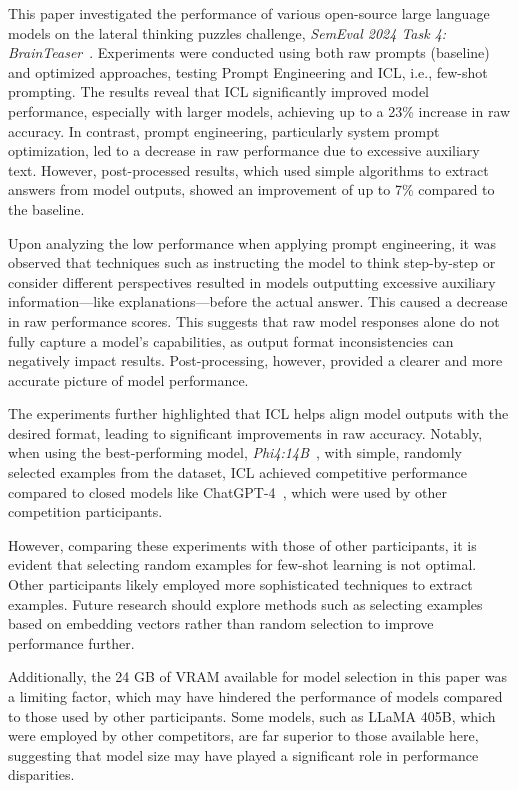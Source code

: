 This paper investigated the performance of various open-source large language models on the lateral thinking puzzles challenge, \textit{SemEval 2024 Task 4: BrainTeaser}~\cite{jiangBRAINTEASERLateralThinking2023}. Experiments were conducted using both raw prompts (baseline) and optimized approaches, testing Prompt Engineering and \acf{ICL}, i.e., few-shot prompting. The results reveal that \ac{ICL} significantly improved model performance, especially with larger models, achieving up to a 23\% increase in raw accuracy. In contrast, prompt engineering, particularly system prompt optimization, led to a decrease in raw performance due to excessive auxiliary text. However, post-processed results, which used simple algorithms to extract answers from model outputs, showed an improvement of up to 7\% compared to the baseline.

Upon analyzing the low performance when applying prompt engineering, it was observed that techniques such as instructing the model to think step-by-step or consider different perspectives resulted in models outputting excessive auxiliary information—like explanations—before the actual answer. This caused a decrease in raw performance scores. This suggests that raw model responses alone do not fully capture a model's capabilities, as output format inconsistencies can negatively impact results. Post-processing, however, provided a clearer and more accurate picture of model performance.

The experiments further highlighted that \ac{ICL} helps align model outputs with the desired format, leading to significant improvements in raw accuracy. Notably, when using the best-performing model, \textit{Phi4:14B}~\cite{abdinPhi4TechnicalReport2024}, with simple, randomly selected examples from the dataset, \ac{ICL} achieved competitive performance compared to closed models like ChatGPT-4~\cite{openaiGPT4TechnicalReport2024}, which were used by other competition participants.

However, comparing these experiments with those of other participants, it is evident that selecting random examples for few-shot learning is not optimal. Other participants likely employed more sophisticated techniques to extract examples. Future research should explore methods such as selecting examples based on embedding vectors rather than random selection to improve performance further.

Additionally, the 24 GB of \acf{VRAM} available for model selection in this paper was a limiting factor, which may have hindered the performance of models compared to those used by other participants. Some models, such as LLaMA 405B, which were employed by other competitors, are far superior to those available here, suggesting that model size may have played a significant role in performance disparities.

